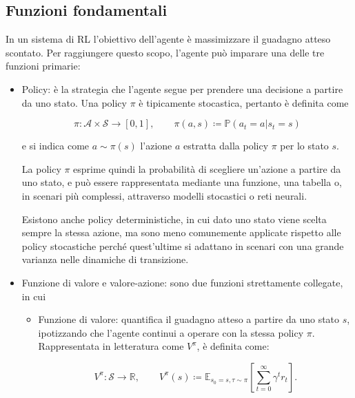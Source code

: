 \subsection{Funzioni fondamentali}
\label{sec:2_rl_functions}

In un sistema di RL l'obiettivo dell'agente è massimizzare il guadagno atteso scontato. Per raggiungere questo scopo, l'agente può imparare una delle tre funzioni primarie:

\begin{itemize}
    \item Policy: è la strategia che l'agente segue per prendere una decisione a partire da uno stato. Una policy $\pi$ è tipicamente stocastica, pertanto è definita come

    \begin{equation}
        \pi: \mathcal{A} \times \mathcal{S} \to [0, 1], \qquad \pi(a, s) \coloneqq \mathbb{P}(a_t = a | s_t = s)
    \end{equation}
    
    e si indica come $a \sim \pi(s)$ l'azione $a$ estratta dalla policy $\pi$ per lo stato $s$.
    
    La policy $\pi$ esprime quindi la probabilità di scegliere un'azione a partire da uno stato, e può essere rappresentata mediante una funzione, una tabella o, in scenari più complessi, attraverso modelli stocastici o reti neurali.
    
    Esistono anche policy deterministiche, in cui dato uno stato viene scelta sempre la stessa azione, ma sono meno comunemente applicate rispetto alle policy stocastiche perché quest'ultime si adattano in scenari con una grande varianza nelle dinamiche di transizione.

    \item Funzione di valore e valore-azione: sono due funzioni strettamente collegate, in cui

    \begin{itemize}
        \item Funzione di valore: quantifica il guadagno atteso a partire da uno stato $s$, ipotizzando che l'agente continui a operare con la stessa policy $\pi$. Rappresentata in letteratura come $V^\pi$, è definita come:

        \begin{equation}
            V^\pi: \mathcal{S} \to \mathbb{R}, \qquad V^\pi(s) \coloneqq \mathbb{E}_{s_0=s, \tau \sim \pi} \left[ \sum_{t=0}^{\infty} \gamma^t r_t\right].
        \end{equation}
    

\end{itemize}
\end{itemize}
